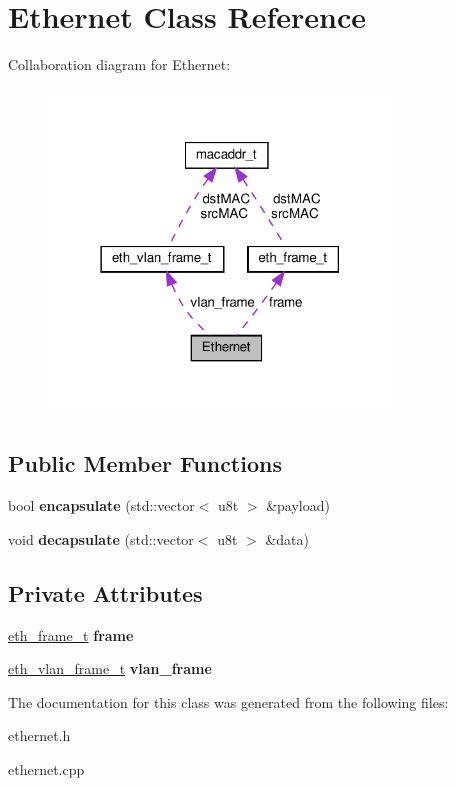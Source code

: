 \hypertarget{classEthernet}{}\section{Ethernet Class Reference}
\label{classEthernet}


Collaboration diagram for Ethernet\+:\nopagebreak
\begin{figure}[H]
\begin{center}
\leavevmode
\includegraphics[width=258pt]{classEthernet__coll__graph}
\end{center}
\end{figure}
\subsection*{Public Member Functions}
\begin{DoxyCompactItemize}
\item 
\mbox{\label{classEthernet_a0ee0a7b0720489214113bde0fb14fd12}} 
bool {\bfseries encapsulate} (std\+::vector$<$ u8t $>$ \&payload)
\item 
\mbox{\label{classEthernet_a6a3304c3cd5c3b79049d24fcc2854f48}} 
void {\bfseries decapsulate} (std\+::vector$<$ u8t $>$ \&data)
\end{DoxyCompactItemize}
\subsection*{Private Attributes}
\begin{DoxyCompactItemize}
\item 
\mbox{\label{classEthernet_a9d4e1ec352eb5209d5675592aebfdd85}} 
\hyperlink{structeth__frame__t}{eth\+\_\+frame\+\_\+t} {\bfseries frame}
\item 
\mbox{\label{classEthernet_ad6f419f6b4c1050af2d4b974186d862e}} 
\hyperlink{structeth__vlan__frame__t}{eth\+\_\+vlan\+\_\+frame\+\_\+t} {\bfseries vlan\+\_\+frame}
\end{DoxyCompactItemize}


The documentation for this class was generated from the following files\+:\begin{DoxyCompactItemize}
\item 
ethernet.\+h\item 
ethernet.\+cpp\end{DoxyCompactItemize}
